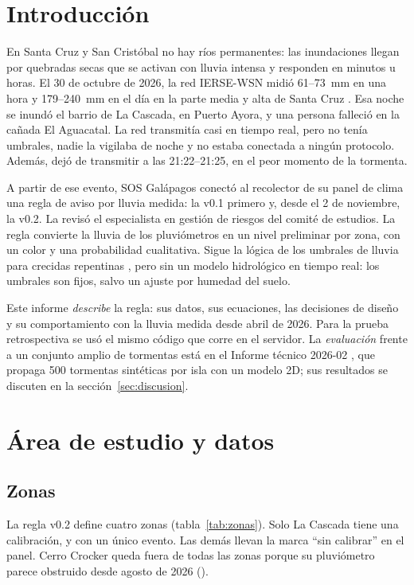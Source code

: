 \documentclass{sosg-informe}
\begin{document}
\section{Introducción}

En Santa Cruz y San Cristóbal no hay ríos permanentes: las inundaciones llegan por quebradas secas que se activan con lluvia intensa y responden en minutos u horas. El 30 de octubre de 2026, la red IERSE-WSN midió 61--73~mm en una hora y 179--240~mm en el día en la parte media y alta de Santa Cruz \citep{orellana2023}. Esa noche se inundó el barrio de La Cascada, en Puerto Ayora, y una persona falleció en la cañada El Aguacatal. La red transmitía casi en tiempo real, pero no tenía umbrales, nadie la vigilaba de noche y no estaba conectada a ningún protocolo. Además, dejó de transmitir a las 21:22--21:25, en el peor momento de la tormenta.

A partir de ese evento, SOS Galápagos conectó al recolector de su panel de clima una regla de aviso por lluvia medida: la v0.1 primero y, desde el 2 de noviembre, la v0.2. La revisó el especialista en gestión de riesgos del comité de estudios. La regla convierte la lluvia de los pluviómetros en un nivel preliminar por zona, con un color y una probabilidad cualitativa. Sigue la lógica de los umbrales de lluvia para crecidas repentinas \citep{georgakakos2006,norbiato2008}, pero sin un modelo hidrológico en tiempo real: los umbrales son fijos, salvo un ajuste por humedad del suelo.

Este informe \emph{describe} la regla: sus datos, sus ecuaciones, las decisiones de diseño y su comportamiento con la lluvia medida desde abril de 2026. Para la prueba retrospectiva se usó el mismo código que corre en el servidor. La \emph{evaluación} frente a un conjunto amplio de tormentas está en el Informe técnico 2026-02 \citep{maya2026idf}, que propaga 500 tormentas sintéticas por isla con un modelo 2D; sus resultados se discuten en la sección~\ref{sec:discusion}.

\section{Área de estudio y datos}

\subsection{Zonas}
La regla v0.2 define cuatro zonas (tabla~\ref{tab:zonas}). Solo La Cascada tiene una calibración, y con un único evento. Las demás llevan la marca \enquote{sin calibrar} en el panel. Cerro Crocker queda fuera de todas las zonas porque su pluviómetro parece obstruido desde agosto de 2026 ().
\end{document}
